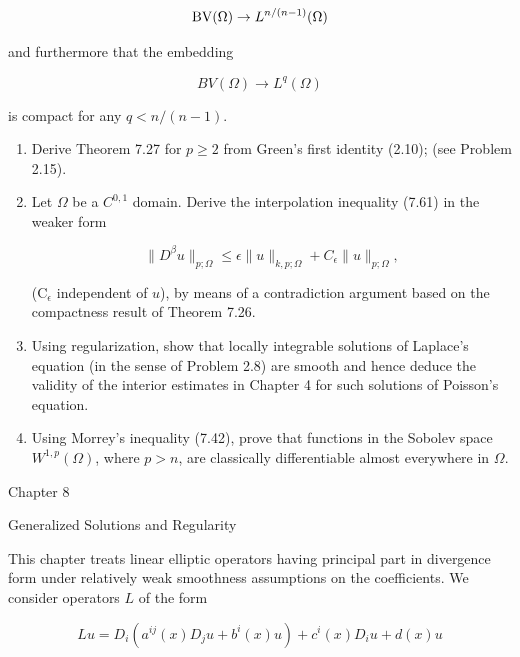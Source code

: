 \[
\operatorname{BV}(\Omega)\to L^{n/(n-1)}(\Omega)
\]



and furthermore that the embedding

\[
BV(\Omega)\to L^q(\Omega)
\]

is compact for any $q<n/(n-1)$.

\begin{enumerate}
\item[7.18.] Derive Theorem 7.27 for $p \geq 2$ from Green's first identity (2.10); (see Problem 2.15).

\item[7.19.] Let $\Omega$ be a $C^{0,1}$ domain. Derive the interpolation inequality (7.61) in the weaker form

\[
\|D^\beta u\|_{p;\Omega} \leq \epsilon \|u\|_{k,p;\Omega} + C_\epsilon \|u\|_{p;\Omega},
\]

\noindent (C$_\epsilon$ independent of $u$), by means of a contradiction argument based on the compactness result of Theorem 7.26.

\item[7.20.] Using regularization, show that locally integrable solutions of Laplace's equation (in the sense of Problem 2.8) are smooth and hence deduce the validity of the interior estimates in Chapter 4 for such solutions of Poisson's equation.

\item[7.21.] Using Morrey's inequality (7.42), prove that functions in the Sobolev space $W^{1,p}(\Omega)$, where $p>n$, are classically differentiable almost everywhere in $\Omega$.
\end{enumerate}


\pagestyle{empty}

Chapter 8

Generalized Solutions and Regularity

This chapter treats linear elliptic operators having principal part in divergence
form under relatively weak smoothness assumptions on the coefficients. We
consider operators $L$ of the form

\begin{equation}
Lu = D_i(a^{ij}(x)D_j u + b^i(x)u) + c^i(x)D_i u + d(x)u
\tag{8.1}
\end{equation}

